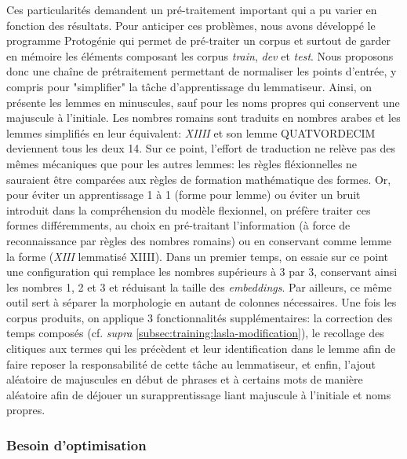 Ces particularités demandent un pré-traitement important qui a pu varier en fonction des résultats. Pour anticiper ces problèmes, nous avons développé le programme Protogénie qui permet de pré-traiter un corpus et surtout de garder en mémoire les éléments composant les corpus \textit{train}, \textit{dev} et \textit{test}. Nous proposons donc une chaîne de prétraitement permettant de normaliser les points d'entrée, y compris pour "simplifier" la tâche d'apprentissage du lemmatiseur. Ainsi, on présente les lemmes en minuscules, sauf pour les noms propres qui conservent une majuscule à l'initiale. Les nombres romains sont traduits en nombres arabes et les lemmes simplifiés en leur équivalent: \textit{XIIII} et son lemme \textsc{QUATVORDECIM} deviennent tous les deux 14. Sur ce point, l'effort de traduction ne relève pas des mêmes mécaniques que pour les autres lemmes: les règles fléxionnelles ne sauraient être comparées aux règles de formation mathématique des formes. Or, pour éviter un apprentissage 1 à 1 (forme pour lemme) ou éviter un bruit introduit dans la compréhension du modèle flexionnel, on préfère traiter ces formes différemments, au choix en pré-traitant l'information (à force de reconnaissance par règles des nombres romains) ou en conservant comme lemme la forme (\textit{XIII} lemmatisé \textsc{XIIII}). Dans un premier temps, on essaie sur ce point une configuration qui remplace les nombres supérieurs à 3 par 3, conservant ainsi les nombres 1, 2 et 3 et réduisant la taille des \textit{embeddings}. Par ailleurs, ce même outil sert à séparer la morphologie en autant de colonnes nécessaires. Une fois les corpus produits, on applique 3 fonctionnalités supplémentaires: la correction des temps composés (cf. \textit{supra} \ref{subsec:training:lasla-modification}), le recollage des clitiques aux termes qui les précèdent et leur identification dans le lemme afin de faire reposer la responsabilité de cette tâche au lemmatiseur, et enfin, l'ajout aléatoire de majuscules en début de phrases et à certains mots de manière aléatoire afin de déjouer un surapprentissage liant majuscule à l'initiale et noms propres.

\subsubsection{Besoin d'optimisation}

